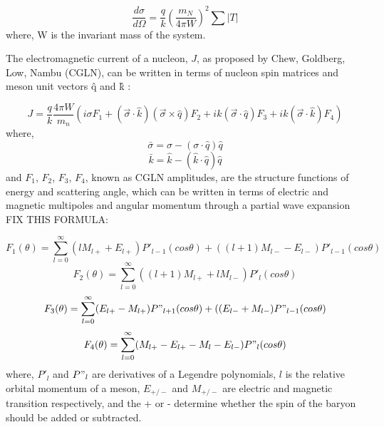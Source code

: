 \begin{equation}
\frac{d\sigma}{d\Omega}=\frac{q}{k}(\frac{m_{N}}{4\pi W})^{2}\sum |T|
\end{equation}
where, W is the invariant mass of the system.

\indent The electromagnetic current of a nucleon, $J$, as proposed by Chew, Goldberg, Low, Nambu (CGLN), can be written in terms of nucleon spin matrices and meson unit vectors \^q and \^k \cite{chew}:

\begin{equation}
J=\frac{q}{k}\frac{4\pi W}{m_{n}}(i\sigma F_{1}+(\vec{\sigma} \cdot \hat{k})(\vec{\sigma} \times \hat{q})F_{2}+i k(\vec{\sigma} \cdot \hat{q})F_{3}+i k(\vec{\sigma} \cdot \hat{k})F_{4})
\end{equation}
where,
\begin{equation}
\bar{\sigma}=\sigma-(\sigma \cdot \hat{q})\hat{q}
\end{equation}
\begin{equation}
\bar{k}=\hat{k}-(\hat{k} \cdot \hat{q})\hat{q}
\end{equation}
and $F_{1}$, $F_{2}$, $F_{3}$, $F_{4}$, known as CGLN amplitudes, are the structure functions of energy and scattering angle, which can be written in terms of electric and magnetic multipoles and angular momentum through a partial wave expansion FIX THIS FORMULA:

\begin{equation}
F_{1}(\theta)=\sum\limits_{l=0}^{\infty} (lM_{l+}+E_{l+})P'_{l-1}(cos\theta)+((l+1)M_{l-}-E_{l-})P'_{l-1}(cos\theta)
\end{equation}
\begin{equation}
F_{2}(\theta)=\sum\limits_{l=0}^{\infty} ((l+1)M_{l+}+lM_{l-})P'_{l}(cos\theta)
\end{equation}
\begin{equation}
F_{3}(\theta)=\sum\limits_{l=0}^{\infty} (E_{l+}-M_{l+})P"_{l+1}(cos\theta)+((E_{l-}+M_{l-})P"_{l-1}(cos\theta)
\end{equation}
\begin{equation}
F_{4}(\theta)=\sum\limits_{l=0}^{\infty} (M_{l+}-E_{l+}-M_{l}-E_{l-})P"_{l}(cos\theta)
\end{equation}
where, $P'_{l}$ and $P"_{l}$ are derivatives of a Legendre polynomials, $l$ is the relative orbital momentum of a meson, $E_{+/-}$ and $M_{+/-}$ are electric and magnetic transition respectively, and the + or - determine whether the spin of the baryon should be added or subtracted.

